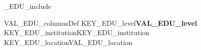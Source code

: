
%
\ifVAL_EDU_include %
\begin{myTableEnv}{VAL_EDU_columnsDef}%
    \myRow
        {KEY_EDU_level}{\bfseries VAL_EDU_level} %
        {KEY_EDU_institution}{KEY_EDU_institution} %
    \myRow
        {}{}%
        {KEY_EDU_location}{VAL_EDU_location}%
\end{myTableEnv}%
%
\fi
%